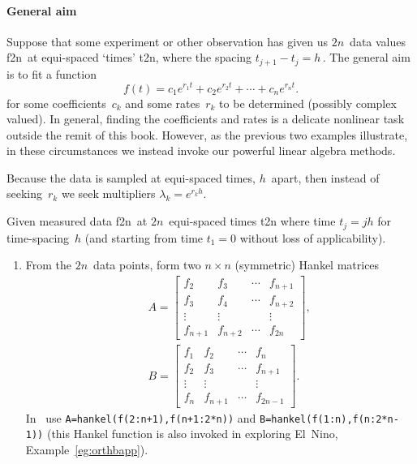 \begin{draft}
\paragraph{General aim}
Suppose that some experiment or other observation has given us \(2n\)~data values \hlist f{2n}\ at equi-spaced `times' \hlist t{2n}, where the spacing \(t_{j+1}-t_j=h\)\,.
The general aim is to fit a function \cite[\S2.6, e.g.]{Cuyt2015}
\begin{equation}
f(t)=c_1e^{r_1t}+c_2e^{r_2t}+\cdots+c_ne^{r_nt}.
\end{equation}
for some coefficients~\(c_k\) and some rates~\(r_k\) to be determined (possibly complex valued).
In general, finding the coefficients and rates is a delicate nonlinear task outside the remit of this book.
However, as the previous two examples illustrate, in these circumstances we instead invoke our powerful linear algebra methods.

Because the data is sampled at equi-spaced times, \(h\)~apart, then instead of seeking~\(r_k\) we seek multipliers \(\lambda_k=e^{r_kh}\).

\begin{procedure} \label{pro:ei}
Given measured data \hlist f{2n}\ at \(2n\)~equi-spaced times \hlist t{2n} where time \(t_j=jh\) for time-spacing~\(h\) (and starting from time \(t_1=0\) without loss of applicability).
\begin{enumerate}
\item From the \(2n\)~data points, form two \(n\times n\) (symmetric) Hankel matrices 
\begin{eqnarray*}&&
A=\begin{bmatrix} f_2&f_3&\cdots&f_{n+1}
\\f_3&f_4&\cdots&f_{n+2}
\\\vdots&\vdots&&\vdots
\\f_{n+1}&f_{n+2}&\cdots&f_{2n} \end{bmatrix},
\\&&
B=\begin{bmatrix} f_1&f_2&\cdots&f_{n}
\\f_2&f_3&\cdots&f_{n+1}
\\\vdots&\vdots&&\vdots
\\f_{n}&f_{n+1}&\cdots&f_{2n-1} \end{bmatrix}.
\end{eqnarray*}
In \script\ use \verb|A=hankel(f(2:n+1),f(n+1:2*n))| and \verb|B=hankel(f(1:n),f(n:2*n-1))| (this Hankel function is also invoked in exploring El~Nino, Example~\ref{eg:orthbapp}).


\end{enumerate}
\end{procedure}
\end{draft}
